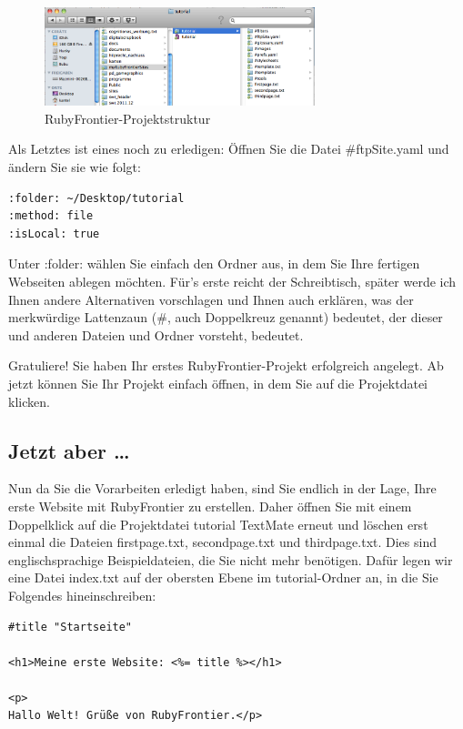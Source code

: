 \documentclass[11pt]{report}
\begin{document}
\begin{figure}[h!]
\centering
\includegraphics[width=0.7\textwidth]{./images/projektstruktur-1.png}
\caption{\label{projektstruktur-1}RubyFrontier-Projektstruktur}
\end{figure}

Als Letztes ist eines noch zu erledigen: Öffnen Sie die
Datei \#ftpSite.yaml und ändern Sie sie wie folgt:



\begin{verbatim}
:folder: ~/Desktop/tutorial
:method: file
:isLocal: true
\end{verbatim}

Unter :folder: wählen Sie einfach den Ordner aus, in dem Sie Ihre
fertigen Webseiten ablegen möchten. Für’s erste reicht der
Schreibtisch, später werde ich Ihnen andere Alternativen vorschlagen
und Ihnen auch erklären, was der merkwürdige Lattenzaun (\#, auch
Doppelkreuz genannt) bedeutet, der dieser und anderen Dateien und
Ordner vorsteht, bedeutet.


Gratuliere! Sie haben Ihr erstes RubyFrontier-Projekt erfolgreich
angelegt. Ab jetzt können Sie Ihr Projekt einfach öffnen, in dem Sie
auf die Projektdatei klicken.
\subsection{Jetzt aber …}
\label{sec-1-2-2-1}


Nun da Sie die Vorarbeiten erledigt haben, sind Sie endlich in der
Lage, Ihre erste Website mit RubyFrontier zu erstellen. Daher öffnen
Sie mit einem Doppelklick auf die Projektdatei tutorial TextMate
erneut und löschen erst einmal die Dateien firstpage.txt,
secondpage.txt und thirdpage.txt. Dies sind englischsprachige
Beispieldateien, die Sie nicht mehr benötigen. Dafür legen wir eine
Datei index.txt auf der obersten Ebene im tutorial-Ordner an, in die
Sie Folgendes hineinschreiben:



\begin{verbatim}
#title "Startseite"

<h1>Meine erste Website: <%= title %></h1>

<p>
Hallo Welt! Grüße von RubyFrontier.</p>
\end{verbatim}
\end{document}
